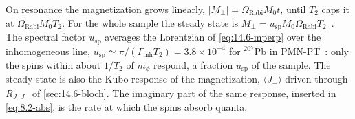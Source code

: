 \noindent On resonance the magnetization grows linearly, $|M_\perp| = \Omega_{\mathrm{Rabi}}M_0t$, until $T_2$ caps it at $\Omega_{\mathrm{Rabi}}M_0T_2$. For the whole sample the steady state is $M_\perp = u_{\mathrm{sp}}M_0\Omega_{\mathrm{Rabi}}T_2$~\cite[Eq.~(1)]{aybas2021search}. The spectral factor $u_{\mathrm{sp}}$ averages the Lorentzian of \cref{eq:14.6-mperp} over the inhomogeneous line, $u_{\mathrm{sp}} \simeq \pi/(\varGamma_{\mathrm{inh}}T_2) = 3.8\times10^{-4}$ for $^{207}$Pb in PMN-PT~\cite[Eqs.~(S22)--(S25)]{aybas2021search}: only the spins within about $1/T_2$ of $m_\phi$ respond, a fraction $u_{\mathrm{sp}}$ of the sample. The steady state is also the Kubo response of the magnetization, $\langle J_+\rangle$ driven through $R_{J_-J_-}$ of \cref{sec:14.6-bloch}. The imaginary part of the same response, inserted in \cref{eq:8.2-abs}, is the rate at which the spins absorb quanta.

